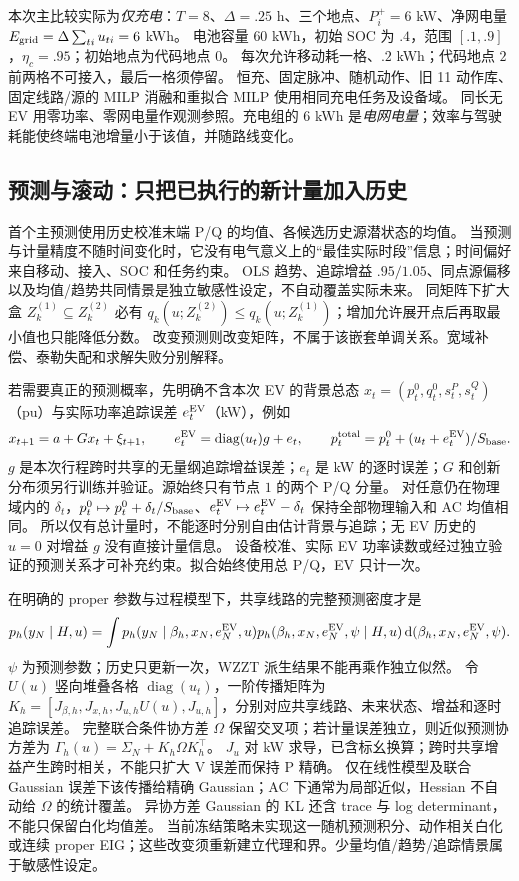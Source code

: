 \documentclass[UTF8,fontset=fandol,11pt,a4paper]{ctexart}
\begin{document}
本次主比较实际为\emph{仅充电}：$T=8$、$\Delta=.25$ h、三个地点、$P_i^+=6$ kW、净网电量 $E_{\rm grid}=\Delta\sum_{ti}u_{ti}=6$ kWh。
电池容量 $60$ kWh，初始 SOC 为 $.4$，范围 $[.1,.9]$，$\eta_c=.95$；初始地点为代码地点 $0$。
每次允许移动耗一格、$.2$ kWh；代码地点 $2$ 前两格不可接入，最后一格须停留。
恒充、固定脉冲、随机动作、旧 11 动作库、固定线路/源的 MILP 消融和重拟合 MILP 使用相同充电任务及设备域。
同长无 EV 用零功率、零网电量作观测参照。充电组的 $6$ kWh 是\emph{电网电量}；效率与驾驶耗能使终端电池增量小于该值，并随路线变化。

\subsection{预测与滚动：只把已执行的新计量加入历史}
首个主预测使用历史校准末端 P/Q 的均值、各候选历史源潜状态的均值。
当预测与计量精度不随时间变化时，它没有电气意义上的“最佳实际时段”信息；时间偏好来自移动、接入、SOC 和任务约束。
OLS 趋势、追踪增益 $.95/1.05$、同点源偏移以及均值/趋势共同情景是独立敏感性设定，不自动覆盖实际未来。
同矩阵下扩大盒 $Z_k^{(1)}\subseteq Z_k^{(2)}$ 必有 $q_k(u;Z_k^{(2)})\le q_k(u;Z_k^{(1)})$；增加允许展开点后再取最小值也只能降低分数。
改变预测则改变矩阵，不属于该嵌套单调关系。宽域补偿、泰勒失配和求解失败分别解释。

若需要真正的预测概率，先明确不含本次 EV 的背景总态 $x_t=(p_t^0,q_t^0,s_t^P,s_t^Q)$（pu）与实际功率追踪误差 $e_t^{\rm EV}$（kW），例如
\begin{equation}
 x_{t+1}=a+Gx_t+\xi_{t+1},\qquad
 e_t^{\rm EV}=\operatorname{diag}(u_t)g+e_t,\qquad
 p_t^{\rm total}=p_t^0+(u_t+e_t^{\rm EV})/S_{\rm base}.
 \label{eq:adapt-predictive}
\end{equation}
$g$ 是本次行程跨时共享的无量纲追踪增益误差；$e_t$ 是 kW 的逐时误差；$G$ 和创新分布须另行训练并验证。源始终只有节点 $1$ 的两个 P/Q 分量。
对任意仍在物理域内的 $\delta_t$，$p_t^0\mapsto p_t^0+\delta_t/S_{\rm base}$、$e_t^{\rm EV}\mapsto e_t^{\rm EV}-\delta_t$ 保持全部物理输入和 AC 均值相同。
所以仅有总计量时，不能逐时分别自由估计背景与追踪；无 EV 历史的 $u=0$ 对增益 $g$ 没有直接计量信息。
设备校准、实际 EV 功率读数或经过独立验证的预测关系才可补充约束。拟合始终使用总 P/Q，EV 只计一次。

在明确的 proper 参数与过程模型下，共享线路的完整预测密度才是
\[
 p_h(y_N\mid H,u)=\int p_h(y_N\mid\beta_h,x_N,e_N^{\rm EV},u)
  p_h(\beta_h,x_N,e_N^{\rm EV},\psi\mid H,u)
  \,\mathrm d(\beta_h,x_N,e_N^{\rm EV},\psi).
\]
$\psi$ 为预测参数；历史只更新一次，WZZT 派生结果不能再乘作独立似然。
令 $U(u)$ 竖向堆叠各格 $\operatorname{diag}(u_t)$，一阶传播矩阵为
$K_h=[J_{\beta,h},J_{x,h},J_{u,h}U(u),J_{u,h}]$，分别对应共享线路、未来状态、增益和逐时追踪误差。
完整联合条件协方差 $\Omega$ 保留交叉项；若计量误差独立，则近似预测协方差为 $\Gamma_h(u)=\Sigma_N+K_h\Omega K_h^\top$。
$J_u$ 对 kW 求导，已含标幺换算；跨时共享增益产生跨时相关，不能只扩大 V 误差而保持 P 精确。
仅在线性模型及联合 Gaussian 误差下该传播给精确 Gaussian；AC 下通常为局部近似，Hessian 不自动给 $\Omega$ 的统计覆盖。
异协方差 Gaussian 的 KL 还含 trace 与 log determinant，不能只保留白化均值差。
当前冻结策略未实现这一随机预测积分、动作相关白化或连续 proper EIG；这些改变须重新建立代理和界。少量均值/趋势/追踪情景属于敏感性设定。
\end{document}
